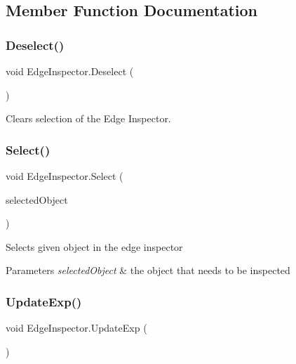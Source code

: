 \subsection{Member Function Documentation}
\mbox{\label{class_edge_inspector_a695897e9dfd53c8d147f2897d3ff21f9}} 
\subsubsection{\texorpdfstring{Deselect()}{Deselect()}}
{\footnotesize\ttfamily void Edge\+Inspector.\+Deselect (\begin{DoxyParamCaption}{ }\end{DoxyParamCaption})}



Clears selection of the Edge Inspector. 

\mbox{\label{class_edge_inspector_a92090d3f3e51f3f0c164c457d3be8eea}} 
\subsubsection{\texorpdfstring{Select()}{Select()}}
{\footnotesize\ttfamily void Edge\+Inspector.\+Select (\begin{DoxyParamCaption}\item[{Game\+Object}]{selected\+Object }\end{DoxyParamCaption})}



Selects given object in the edge inspector 


\begin{DoxyParams}{Parameters}
{\em selected\+Object} & the object that needs to be inspected \\
\hline
\end{DoxyParams}
\mbox{\label{class_edge_inspector_a2516d546da9c4b3c74f29608a712fa27}} 
\subsubsection{\texorpdfstring{Update\+Exp()}{UpdateExp()}}
{\footnotesize\ttfamily void Edge\+Inspector.\+Update\+Exp (\begin{DoxyParamCaption}{ }\end{DoxyParamCaption})}



